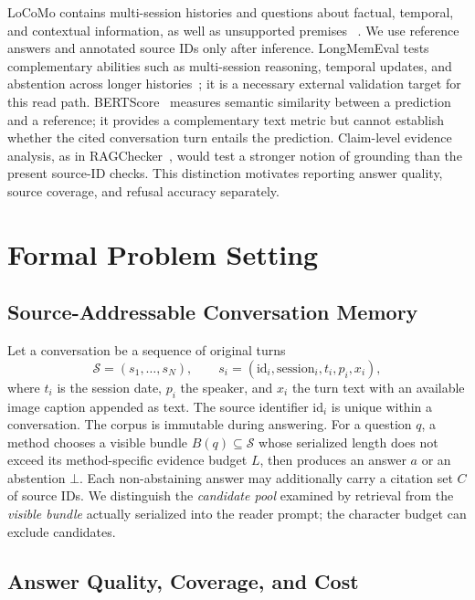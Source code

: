 \documentclass[11pt]{article}
\newcommand{\botans}{\bot}
\newcommand{\sources}{\mathcal{S}}
\begin{document}
LoCoMo contains multi-session histories and questions about factual,
temporal, and contextual information, as well as unsupported premises
~\cite{maharana2024locomo}. We use reference answers and annotated source
IDs only after inference. LongMemEval tests complementary abilities such as
multi-session reasoning, temporal updates, and abstention across longer
histories~\cite{wu2024longmemeval}; it is a necessary external validation
target for this read path. BERTScore~\cite{zhang2020bertscore} measures
semantic similarity between a prediction and a reference; it provides a
complementary text metric but cannot establish whether the cited conversation
turn entails the prediction. Claim-level evidence analysis, as in
RAGChecker~\cite{ru2024ragchecker}, would test a stronger notion of grounding
than the present source-ID checks. This distinction motivates reporting
answer quality, source coverage, and refusal accuracy separately.

\section{Formal Problem Setting}
\label{sec:setting}

\subsection{Source-Addressable Conversation Memory}

Let a conversation be a sequence of original turns
\begin{equation}
\sources = (s_1,\ldots,s_N),\qquad
s_i=(\mathrm{id}_i,\mathrm{session}_i,t_i,p_i,x_i),
\label{eq:source}
\end{equation}
where $t_i$ is the session date, $p_i$ the speaker, and $x_i$ the turn text
with an available image caption appended as text. The source identifier
$\mathrm{id}_i$ is unique within a conversation. The corpus is immutable
during answering. For a question $q$, a method chooses a visible bundle
$B(q)\subseteq\sources$ whose serialized length does not exceed its
method-specific evidence budget $L$, then produces an answer $a$ or an
abstention $\botans$. Each
non-abstaining answer may additionally carry a citation set $C$ of source
IDs. We distinguish the \emph{candidate pool} examined by retrieval from
the \emph{visible bundle} actually serialized into the reader prompt; the
character budget can exclude candidates.

\subsection{Answer Quality, Coverage, and Cost}
\end{document}
